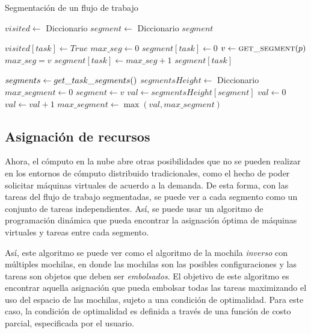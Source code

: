 \begin{algorithm}
\caption{Segmentación de un flujo de trabajo}
\label{alg_blind_segments}
\begin{algorithmic}[1]
	\State $visited \gets$ Diccionario
	\State $segment \gets$ Diccionario
		\State {}
	\EndFor
	\State \Return $segment$
\EndProcedure

	\State $visited[task] \gets True$
	\State $max\_seg \gets 0$
		\State $segment[task] \gets 0$
			\State $v \gets \Call{get\_segment}{p}$
				\State $max\_seg = v$
			\EndIf
		\EndFor
		\State $segment[task] \gets max\_seg + 1$
	\EndIf
	\State \Return $segment[task]$
\EndProcedure


	\State $segments \gets \Call{$get\_task\_segments$}$
	\State $segmentsHeight \gets $ Diccionario
	\State $max\_segment \gets 0$
		\State $segment \gets v$
			\State $val \gets segmentsHeight[ segment ]$
		\Else
			\State $val \gets 0$
		\EndIf
		\State $val \gets val + 1$
		\State $max\_segment \gets \max(val, max\_segment)$
	\EndFor
\EndProcedure
	
\end{algorithmic}
\end{algorithm}

\subsection{Asignación de recursos}

Ahora, el cómputo en la nube abre otras posibilidades que no se pueden realizar en los entornos de cómputo distribuido tradicionales, como el hecho de poder solicitar máquinas virtuales de acuerdo a la demanda. De esta forma, con las tareas del flujo de trabajo segmentadas, se puede ver a cada segmento como un conjunto de tareas independientes. Así, se puede usar un algoritmo de programación dinámica que pueda encontrar la asignación óptima de máquinas virtuales y tareas entre cada segmento.

Así, este algoritmo se puede ver como el algoritmo de la mochila \emph{inverso} con múltiples mochilas, en donde las mochilas son las posibles configuraciones y las tareas son objetos que deben ser \emph{embolsados}. El objetivo de este algoritmo es encontrar aquella asignación que pueda embolsar todas las tareas maximizando el uso del espacio de las mochilas, sujeto a una condición de optimalidad. Para este caso, la condición de optimalidad es definida a trav\'es de una funci\'on de costo parcial, especificada por el usuario. 

